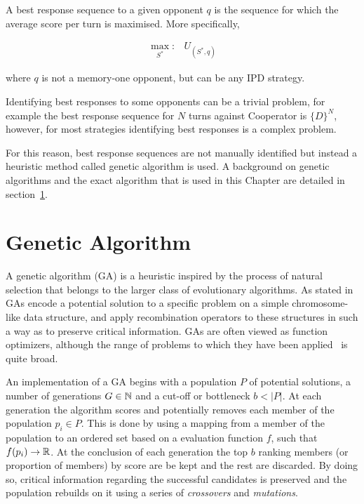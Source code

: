 A best response sequence to a given opponent \(q\) is the sequence for which the
average score per turn is maximised. More specifically,

\begin{equation}\label{eq:best_response}
    \begin{aligned}
    \max_{S^*}: & U_{(S^*, q)}
    \end{aligned}
\end{equation}

where \(q\) is not a memory-one opponent, but can be any IPD strategy.

Identifying best responses to some opponents can be a trivial problem, for
example the best response sequence for \(N\) turns against Cooperator is
\(\{D\}^N\), however, for most strategies identifying best responses is a
complex problem.

For this reason, best response sequences are not manually identified but instead
a heuristic method called genetic algorithm is used. A background on genetic
algorithms and the exact algorithm that is used in this Chapter are detailed in
section~\ref{section:genetic_algorithm}.

\section{Genetic Algorithm}\label{section:genetic_algorithm}

A genetic algorithm (GA) is a heuristic inspired by the process of natural
selection that belongs to the larger class of evolutionary algorithms. As stated
in~\cite{Whitley1994} GAs encode a potential solution to a
specific problem on a simple chromosome-like data structure, and apply
recombination operators to these structures in such a way as to preserve
critical information. GAs are often viewed as function
optimizers, although the range of problems to which they have been
applied~\cite{Hou1994, Jones1997, Yang1998} is quite broad.

An implementation of a GA begins with a population \(P\) of
potential solutions, a number of generations \(G \in \mathbb{N}\) and a cut-off or
bottleneck \(b < |P|\). At each generation the algorithm scores and potentially
removes each member of the population \(p_i \in P\). This is done by using a
mapping from a member of the population to an ordered set based on a evaluation
function \(f\), such that \(f(p_i) \to \mathbb{R}\). At the conclusion of each
generation the top \(b\) ranking members (or proportion of members) by score are
be kept and the rest are discarded. By doing so, critical information regarding
the successful candidates is preserved and the population rebuilds on it using a
series of \textit{crossovers} and \textit{mutations}.

